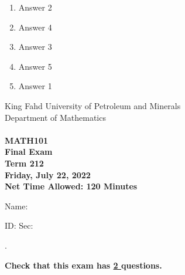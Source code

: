 \documentclass[amsfonts,bezier,leqno,fleqn,12pt,a4paper]{article}
\begin{document}
{{\begin{large}
\begin{enumerate}
\begin{enumerate}
\item  Answer 2
\item  Answer 4
\item  Answer 3
\item  Answer 5
\item  Answer 1

\end{enumerate}
\newpage


\end{enumerate}
\end{large}


\newpage


\thispagestyle{empty}
\begin{center}
    \begin{large}
        King Fahd University of Petroleum and Minerals \\ 
        Department of Mathematics  \\ 
        \vspace*{4.5cm}
        {\bf {} }  \hfill {\bf {}} \\
        {\bf MATH101 }  \\
        {\bf Final Exam }  \\
        {\bf Term 212 }  \\
        {\bf Friday, July 22, 2022 }  \\ 
        {\bf Net Time Allowed: 120 Minutes }  \\
        \vspace*{0.2cm}

    \end{large}
\end{center}

\large{Name:  }\hrulefill

\vspace{3mm}

\large{ID: } \hrulefill \large{  Sec: } \hrulefill \large{.

\vspace{1cm}

\large{\bf{Check that this exam has {\underline{ 2 }} questions.}}

\vspace{1cm}

}}}
\end{document}
